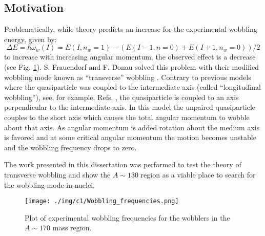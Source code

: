\subsection{Motivation}
\label{ssec:intro-rot-motivation}
Problematically, while theory predicts an increase for the experimental wobbling energy, given by:
\begin{equation}
\Delta{}E=\hbar\omega_w(I)=E(I,n_w=1)-(E(I-1,n=0)+E(I+1,n_w=0))/2
\end{equation}
to increase with increasing angular momentum, the observed effect is a decrease (see Fig. \ref{fig:chp1-wobbling-freq}). S. Frauendorf and F. D\"{}onau solved this problem with their modified wobbling mode known as ``transverse'' wobbling \cite{frauendorfTransverseWobbling}. Contrary to previous models where the quasiparticle was coupled to the intermediate axis (called ``longitudinal wobbling''), see, for example, Refs. \cite{oldQTRWobblingTheory1,oldQTRWobblingTheory2,oldQTRWobblingTheory3,oldQTRWobblingTheory4}, the quasiparticle is coupled to an axis perpendicular to the intermediate axis. In this model the unpaired quasiparticle couples to the short axis which causes the total angular momentum to wobble about that axis. As angular momentum is added rotation about the medium axis is favored and at some critical angular momentum the motion becomes unstable and the wobbling frequency drops to zero.

The work presented in this dissertation was performed to test the theory of transverse wobbling and show the $A\sim{}130$ region as a viable place to search for the wobbling mode in nuclei.

\begin{figure}[t!]
\centerline{\texttt{[image: ./img/c1/Wobbling\_frequencies.png]}}
	\caption{Plot of experimental wobbling frequencies for the wobblers in the $A\sim{}170$ mass region.\label{fig:chp1-wobbling-freq}}
\end{figure}
